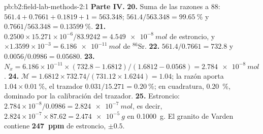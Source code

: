 \begin{solution}{pb:b2:field-lab-methods-2:1}
\noindent\textbf{Parte IV.}
\textbf{20.} Suma de las razones a 88: $561.4 + 0.7661 + 0.1819 + 1 = 563.348$; $561.4/563.348 =
\qty{99.65}{\percent}$ y $0.7661/563.348 = \qty{0.13599}{\percent}$.
\textbf{21.} $0.2500 \times 15.271 \times 10^{-6}/83.9242 = \qty{4.549e-8}{mol}$ de estroncio, y
$\times 1.3599 \times 10^{-3} = \qty{6.186e-11}{mol}$ de $^{86}\mathrm{Sr}$.
\textbf{22.} $561.4/0.7661 = 732.8$ y $0.0056/0.0986 = 0.05680$.
\textbf{23.} $N_x = 6.186 \times 10^{-11} \times (732.8 - 1.6812)/(1.6812 - 0.0568) =
\qty{2.784e-8}{mol}$.
\textbf{24.} $\mathcal M = 1.6812 \times 732.74/(731.12 \times 1.6244) = 1.04$; la razón aporta
$1.04 \times \qty{0.01}{\percent}$, el trazador $0.031/15.271 = \qty{0.20}{\percent}$; en cuadratura,
\qty{0.20}{\percent}, dominado por la calibración del trazador.
\textbf{25.} Estroncio: $2.784 \times 10^{-8}/0.0986 = \qty{2.824e-7}{mol}$, es decir, $2.824 \times
10^{-7} \times 87.62 = \qty{2.474e-5}{g}$ en \qty{0.1000}{g}. El granito de Varden contiene
\textbf{\qty[text-series-to-math=true]{247}{ppm}} de estroncio, $\pm 0.5$.
\end{solution}
